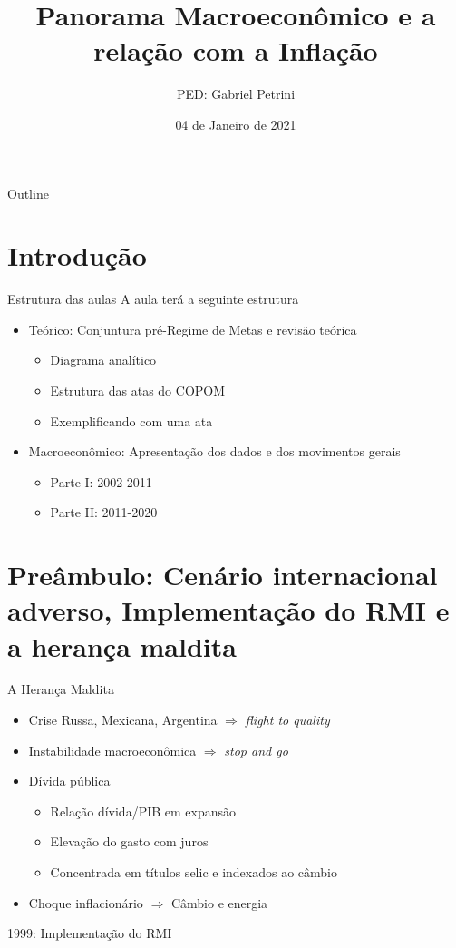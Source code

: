 \documentclass[presentation]{beamer}
\author{PED: Gabriel Petrini}
\date{04 de Janeiro de 2021}
\title{Panorama Macroeconômico e a relação com a Inflação}
\begin{document}
\maketitle
\begin{frame}{Outline}
\tableofcontents
\end{frame}

\section{Introdução}
\label{sec:orgba5f31e}

\begin{frame}[label={sec:org7c3b14f}]{Estrutura das aulas}
A aula terá a seguinte estrutura
\begin{itemize}
\item \alert{Teórico:} Conjuntura pré-Regime de Metas e revisão teórica
\begin{itemize}
\item Diagrama analítico
\item Estrutura das atas do COPOM
\item Exemplificando com uma ata
\end{itemize}
\item \alert{Macroeconômico:} Apresentação dos dados e dos movimentos gerais
\begin{itemize}
\item Parte I: 2002-2011
\item Parte II: 2011-2020
\end{itemize}
\end{itemize}
\end{frame}


\section{Preâmbulo: Cenário internacional adverso, Implementação do RMI e a herança maldita}
\label{sec:orgd34d33f}

\begin{frame}[label={sec:orgf7f3202}]{A Herança Maldita \cite{belluzzoDepoisQuedaEconomia2002}}
\begin{itemize}
\item Crise Russa, Mexicana, Argentina \(\Rightarrow\) \emph{flight to quality}
\item Instabilidade macroeconômica \(\Rightarrow\) \emph{stop and go}
\item Dívida pública
\begin{itemize}
\item Relação dívida/PIB em expansão
\item Elevação do gasto com juros
\item Concentrada em títulos selic e indexados ao câmbio
\end{itemize}
\item Choque inflacionário \(\Rightarrow\) Câmbio e energia
\end{itemize}

\begin{block}{1999: Implementação do RMI}
\end{block}
\end{frame}
\end{document}
